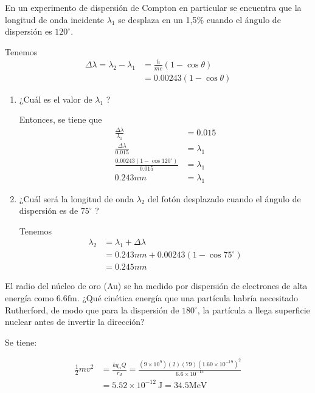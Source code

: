 \begin{problema}
    [Problema 11]  En un experimento de dispersión de Compton en particular se encuentra que la longitud de onda incidente $\lambda_{1}$ se desplaza en un 1,5\% cuando el ángulo de dispersión es $120^{\circ}$. 
    \begin{cajita}
        Tenemos
            \begin{align*}
                \Delta \lambda = \lambda_2-\lambda_1 &= \frac{h}{mc}(1-\cos\theta)\\
                &= 0.00243(1-\cos \theta)
            \end{align*}
    \end{cajita}
    
    \begin{enumerate}
        \item ¿Cuál es el valor de $\lambda_{1}$ ? 
        \begin{sol}
            Entonces, se tiene que 
            \begin{align*}
                \frac{\Delta \lambda}{\lambda_1} &= 0.015\\
                \frac{\Delta \lambda}{0.015} &=\lambda_1\\
                \frac{0.00243(1-\cos 120^{\circ})}{0.015} &=\lambda_1\\
                0.243nm &=\lambda_1
            \end{align*}
        \end{sol}
        \item ¿Cuál será la longitud de onda $\lambda_{2}$ del fotón desplazado cuando el ángulo de dispersión es de $75^{\circ}$ ?
        \begin{sol}
            Tenemos 
            \begin{align*}
                \lambda_2&=\lambda_1+\Delta\lambda\\
                        &= 0.243nm + 0.00243(1-\cos 75^{\circ})\\
                        &= 0.245nm
            \end{align*}
        \end{sol}
    \end{enumerate}
    
    

\end{problema}
\begin{problema}
    [Problema 12] El radio del núcleo de oro (Au) se ha medido por dispersión de electrones de alta energía como $6.6 \mathrm{fm}$. ¿Qué cinética energía que una partícula habría necesitado Rutherford, de modo que para la dispersión de $180^{\circ}$, la partícula a llega superficie nuclear antes de invertir la dirección?
    \begin{sol}
        Se tiene:

        $$\begin{aligned} \frac{1}{2} m v^2 &=\frac{k q_\alpha Q}{r_d}=\frac{\left(9 \times 10^9\right)(2)(79)\left(1.60 \times 10^{-19}\right)^2}{6.6 \times 10^{-15}} \\ &=5.52 \times 10^{-12} \mathrm{~J}=34.5 \mathrm{MeV} \end{aligned}$$
    \end{sol}
\end{problema}

